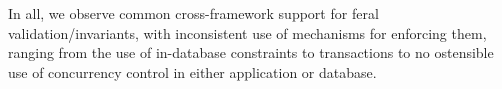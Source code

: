  In all, we observe common cross-framework support
for feral validation/invariants, with inconsistent use of mechanisms
for enforcing them, ranging from the use of in-database constraints to
transactions to no ostensible use of concurrency control in either
application or database.


\begin{comment}

Name & PK & FK & UDF Validations
DJANGO & Automatic & Automatic & Yes
JPA & Yes, annotation & Yes, annotation & Yes, via Beans
CakePHP & 


Supports validations
https://docs.djangoproject.com/en/dev/ref/validators/

Broken online: http://stackoverflow.com/a/5690705


1.9 (not yet released) deprecating in favor of checks
https://docs.djangoproject.com/en/1.7/internals/deprecation/

checks:
https://docs.djangoproject.com/en/1.7/topics/checks/




does it right
https://docs.djangoproject.com/en/1.7/ref/models/fields/#django.db.models.ForeignKey


does it right, by default declares an index
https://docs.djangoproject.com/en/1.7/_modules/django/db/backends/schema/


'''
If True, this field must be unique throughout the table.

This is enforced at the database level and by model validation. If you try to save a model with a duplicate value in a unique field, a django.db.IntegrityError will be raised by the model’s save() method.

This option is valid on all field types except ManyToManyField, OneToOneField, and FileField.

Note that when unique is True, you don’t need to specify db_index, because unique implies the creation of an index.
'''
a




no FK by default, relies on JPA
http://docs.jboss.org/hibernate/orm/4.3/manual/en-US/html/ch08.html

JoinColumn
http://docs.oracle.com/javaee/6/api/javax/persistence/OneToMany.html


\end{comment}
